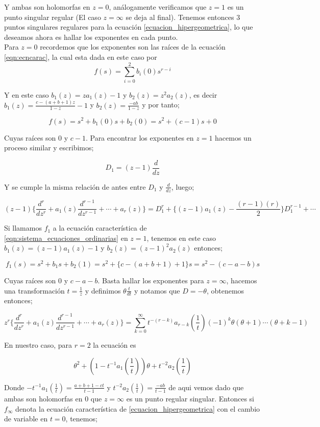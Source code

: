 Y ambas son holomorfas en $z=0$, an\'alogamente verificamos que $z=1$ es un punto singular regular (El caso $z= \infty $ se deja al final). Tenemos entonces 3 puntos singulares regulares para la ecuaci\'on \ref{ecuacion_hipergeometrica}, lo que deseamos ahora es hallar los exponentes en cada punto.\\

Para $z=0$ recordemos que los exponentes son las ra\'ices de la ecuaci\'on \ref{eqn:ecncarac}, la cual esta dada en este caso por
$$f(s) = \sum_{i=0}^{2} b_{i}(0) s^{r-i} $$

Y en este caso $b_{1}(z) = za_{1}(z) -1$ y $ b_{2}(z)= z^{2}a_{2}(z)$, es decir $b_{1}(z) = \frac{c-(a+b+1)z}{1-z} -1$ y $b_{2}(z) = \frac{-ab}{1-z}$ y por tanto;

$$f(s)= s^{2} +b_{1}(0)s + b_{2}(0) = s^{2} + (c-1)s +0 $$

Cuyas ra\'ices son 0 y $c-1$. Para encontrar los exponentes en $z=1$ hacemos un proceso similar y escribimos;

$$D_{1} = (z-1)\frac{d}{dz}$$

Y se cumple la misma relaci\'on de antes entre $D_{1}$ y $\frac{d}{dz}$, luego;

$$(z-1) \lbrace \frac{d^{r}}{dz^{r}} + a_{1}(z)\frac{d^{r-1}}{dz^{r-1}}+ \cdots + a_{r}(z) \rbrace = D_{1}^{r} + \lbrace (z-1)a_{1}(z) - \frac{(r-1)(r)}{2} \rbrace D_{1}^{r-1} + \cdots $$

Si llamamos $f_{1}$ a la ecuaci\'on caracter\'istica de \ref{eqn:sistema_ecuaciones_ordinarias} en $z=1$, tenemos en este caso $b_{1}(z)= (z-1)a_{1}(z) -1$ y $ b_{2}(z) = (z-1)^{2}a_{2}(z)$ entonces;

$$ f_{1}(s) = s^{2} + b_{1}s + b_{2}(1)= s^{2} + \lbrace c-(a+b+1) +1 \rbrace s = s^{2} - (c-a-b)s $$

Cuyas ra\'ices son $0$ y $c-a-b$. Basta hallar los exponentes para $z= \infty$, hacemos una transformaci\'on $t=\frac{1}{z}$ y definimos $\theta \frac{t}{dt}$ y notamos que $D=- \theta$, obtenemos entonces;

$$z^{r} \lbrace \frac{d^{r}}{dz^{r}} + a_{1}(z) \frac{d^{r-1}}{dz^{r-1}} + \cdots +a_{r}(z) \rbrace = \sum_{k=0}^{\infty} t^{-(r-k)}a_{r-k} (\frac{1}{t})(-1)^{k} \theta (\theta +1) \cdots (\theta + k-1)$$

En nuestro caso, para $r=2$ la ecuaci\'on es

$$\theta^{2} + (1-t^{-1}a_{1}(\frac{1}{t}))\theta + t^{-2}a_{2}(\frac{1}{t}) $$

Donde $-t^{-1}a_{1}(\frac{1}{t}) = \frac{a+b+1-ct}{t-1}$ y $t^{-2}a_{2}(\frac{1}{t})= \frac{-ab}{t-1}$ de aqui vemos dado que ambas son holomorfas en $0$ que $z= \infty$ es un punto regular singular. Entonces si $f_{\infty}$ denota la ecuaci\'on caracter\'istica de \ref{ecuacion_hipergeometrica} con el cambio de variable en $t=0$, tenemos;

